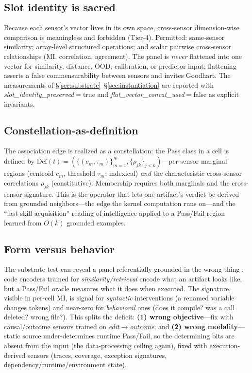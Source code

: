 \documentclass[10pt,twocolumn]{article}
\begin{document}
\subsection{Slot identity is sacred}
Because each sensor's vector lives in its own space, cross-sensor dimension-wise
comparison is meaningless and forbidden (Tier-4). Permitted: same-sensor
similarity; array-level structured operations; and scalar pairwise cross-sensor
relationships (MI, correlation, agreement). The panel is \emph{never} flattened
into one vector for similarity, distance, OOD, calibration, or predictor input;
flattening asserts a false commensurability between sensors and invites Goodhart.
The measurements of \S\ref{sec:substrate}--\S\ref{sec:instantiation} are reported
with \textit{slot\_identity\_preserved}$=$true and
\textit{flat\_vector\_concat\_used}$=$false as explicit invariants.

\subsection{Constellation-as-definition}
The association edge is realized as a constellation: the \textsf{Pass} class in a
cell is defined by
$\mathrm{Def}(t)=(\{(c_m,\tau_m)\}_{m=1}^{N},\{\rho_{jk}\}_{j<k})$---per-sensor
marginal regions (centroid $c_m$, threshold $\tau_m$; indexical) \emph{and} the
characteristic cross-sensor correlations $\rho_{jk}$ (constitutive). Membership
requires both marginals and the cross-sensor signature. This is the operator that
lets one artifact's verdict be derived from grounded neighbors---the edge the
kernel computation runs on---and the ``fast skill acquisition'' reading of
intelligence \citep{chollet2019measure} applied to a \textsf{Pass}/\textsf{Fail}
region learned from $O(k)$ grounded examples.

\subsection{Form versus behavior}
The substrate test can reveal a panel referentially grounded in the wrong thing
\citep{mollo2023vector}: code encoders trained for \emph{similarity/retrieval}
encode what an artifact looks like, but a \textsf{Pass}/\textsf{Fail} oracle
measures what it does when executed. The signature, visible in per-cell MI, is
signal for \emph{syntactic} interventions (a renamed variable changes tokens) and
near-zero for \emph{behavioral} ones (does it compile? was a call deleted? wrong
file?). This splits the deficit: \textbf{(1) wrong objective}---fix with
causal/outcome sensors trained on \emph{edit}$\to$\emph{outcome}; and
\textbf{(2) wrong modality}---static source under-determines runtime
\textsf{Pass}/\textsf{Fail}, so the determining bits are absent from the input
(the data-processing ceiling again), fixed with execution-derived sensors
(traces, coverage, exception signatures, dependency/runtime/environment state).
\end{document}
